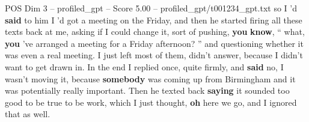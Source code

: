 \begin{textsample}{POS Dim 3 – profiled\_gpt – Score 5.00 – profiled\_gpt/t001234\_gpt.txt}  \label{ex:f3_pos_021}
so I ’d \textbf{said} to him I ’d got a meeting on the Friday, and then he started firing all these texts back at me, asking if I could change it, sort of pushing, \textbf{you} \textbf{know}, “ what, \textbf{you} ’ve arranged a meeting for a Friday afternoon? ” and questioning whether it was even a real meeting.
I just left most of them, didn't answer, because I didn't want to get drawn in.
In the end I replied once, quite firmly, and \textbf{said} no, I wasn't moving it, because \textbf{somebody} was coming up from Birmingham and it was potentially really important.
Then he texted back \textbf{saying} it sounded too good to be true to be work, which I just thought, \textbf{oh} here we go, and I ignored that as well.

\end{textsample}
